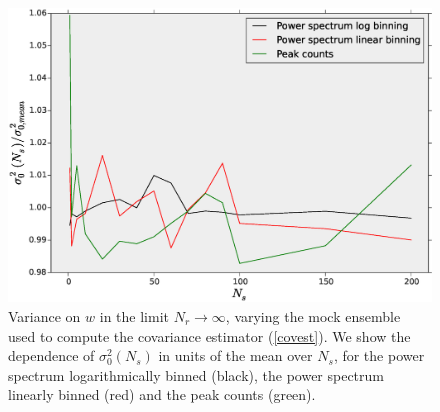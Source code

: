 \documentclass[reprint,aps,prd,superscriptaddress,showkeys,showpacs]{revtex4-1}
\begin{document}
\begin{figure}
\includegraphics[scale=0.3]{Figures/scaling_ns.eps}
\caption{Variance on $w$ in the limit $N_r\rightarrow\infty$, varying the mock ensemble used to compute the covariance estimator (\ref{covest}). We show the dependence of $\sigma_0^2(N_s)$ in units of the mean over $N_s$, for the power spectrum logarithmically binned (black), the power spectrum linearly binned (red) and the peak counts (green).}
\label{wvar_ns}
\end{figure}
\end{document}
